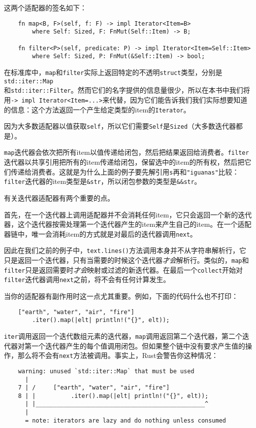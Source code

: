 这两个适配器的签名如下：
\begin{verbatim}
    fn map<B, F>(self, f: F) -> impl Iterator<Item=B>
        where Self: Sized, F: FnMut(Self::Item) -> B;

    fn filter<P>(self, predicate: P) -> impl Iterator<Item=Self::Item>
        where Self: Sized, P: FnMut(&Self::Item) -> bool;
\end{verbatim}

在标准库中，\texttt{map}和\texttt{filter}实际上返回特定的不透明\texttt{struct}类型，分别是\texttt{std::iter::Map}\\
和\texttt{std::iter::Filter}。然而它们的名字提供的信息量很少，所以在本书中我们将用\texttt{-> impl Iterator<Item=...>}来代替，因为它们能告诉我们我们实际想要知道的信息：这个方法返回一个产生给定类型的item的\texttt{Iterator}。

因为大多数适配器以值获取\texttt{self}，所以它们需要\texttt{Self}是\texttt{Sized}（大多数迭代器都是）。

\texttt{map}迭代器会依次把所有item以值传递给闭包，然后把结果返回给消费者。\texttt{filter}迭代器以共享引用把所有的item传递给闭包，保留选中的item的所有权，然后把它们传递给消费者。这就是为什么上面的例子要先解引用\texttt{s}再和\texttt{"iguanas"}比较：\texttt{filter}迭代器的item类型是\texttt{\&str}，所以闭包参数的类型是\texttt{\&\&str}。

有关迭代器适配器有两个重要的点。

首先，在一个迭代器上调用适配器并不会消耗任何item，它只会返回一个新的迭代器，这个迭代器按需处理第一个迭代器产生的item来产生自己的item。在一个适配器链中，唯一会消耗item的方式就是对最后的迭代器调用\texttt{next}。

因此在我们之前的例子中，\texttt{text.lines()}方法调用本身并不从字符串解析行，它只是返回一个迭代器，只有当需要的时候这个迭代器\emph{才会}解析行。类似的，\texttt{map}和\texttt{filter}只是返回需要时\emph{才会}映射或过滤的新迭代器。在最后一个\texttt{collect}开始对\texttt{filter}迭代器调用\texttt{next}之前，将不会有任何计算发生。

当你的适配器有副作用时这一点尤其重要。例如，下面的代码什么也不打印：
\begin{verbatim}
    ["earth", "water", "air", "fire"]
        .iter().map(|elt| println!("{}", elt));
\end{verbatim}

\texttt{iter}调用返回一个迭代数组元素的迭代器，\texttt{map}调用返回第二个迭代器，第二个迭代器对第一个迭代器产生的每个值调用闭包。但如果整个链中没有要求产生值的操作，那么将不会有\texttt{next}方法被调用。事实上，Rust会警告你这种情况：
\begin{verbatim}
    warning: unused `std::iter::Map` that must be used
      |
    7 | /     ["earth", "water", "air", "fire"]
    8 | |          .iter().map(|elt| println!("{}", elt));
      | |________________________________________________^
      |
      = note: iterators are lazy and do nothing unless consumed
\end{verbatim}

